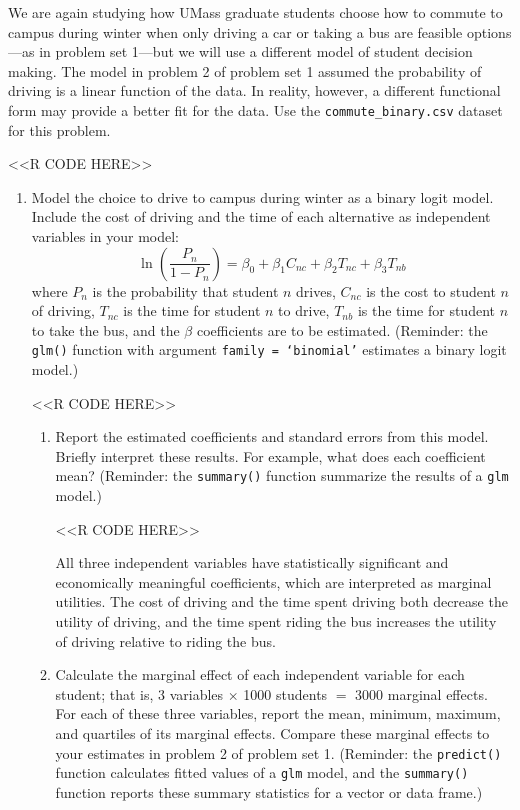 \documentclass[11pt,letterpaper]{article}
\begin{document}
We are again studying how UMass graduate students choose how to commute to campus during winter when only driving a car or taking a bus are feasible options---as in problem set 1---but we will use a different model of student decision making. The model in problem 2 of problem set 1 assumed the probability of driving is a linear function of the data. In reality, however, a different functional form may provide a better fit for the data. Use the \texttt{commute\_binary.csv} dataset for this problem.

<<R CODE HERE>>

\begin{enumerate}[label=\alph*., leftmargin=*]
	\item Model the choice to drive to campus during winter as a binary logit model. Include the cost of driving and the time of each alternative as independent variables in your model:
	$$\ln \left( \frac{P_n}{1 - P_n} \right) = \beta_0 + \beta_1 C_{nc} + \beta_2 T_{nc} + \beta_3 T_{nb}$$
	where $P_n$ is the probability that student $n$ drives, $C_{nc}$ is the cost to student $n$ of driving, $T_{nc}$ is the time for student $n$ to drive, $T_{nb}$ is the time for student $n$ to take the bus, and the $\beta$ coefficients are to be estimated. (Reminder: the \texttt{glm()} function with argument \texttt{family = `binomial'} estimates a binary logit model.)

	<<R CODE HERE>>

	\begin{enumerate}[label=\roman*.]
		\item Report the estimated coefficients and standard errors from this model. Briefly interpret these results. For example, what does each coefficient mean? (Reminder: the \texttt{summary()} function summarize the results of a \texttt{glm} model.)

		<<R CODE HERE>>

		All three independent variables have statistically significant and economically meaningful coefficients, which are interpreted as marginal utilities. The cost of driving and the time spent driving both decrease the utility of driving, and the time spent riding the bus increases the utility of driving relative to riding the bus.

		\item Calculate the marginal effect of each independent variable for each student; that is, 3 variables $\times$ 1000 students $=$ 3000 marginal effects. For each of these three variables, report the mean, minimum, maximum, and quartiles of its marginal effects. Compare these marginal effects to your estimates in problem 2 of problem set 1. (Reminder: the \texttt{predict()} function calculates fitted values of a \texttt{glm} model, and the \texttt{summary()} function reports these summary statistics for a vector or data frame.)


\end{enumerate}
\end{enumerate}
\end{document}

